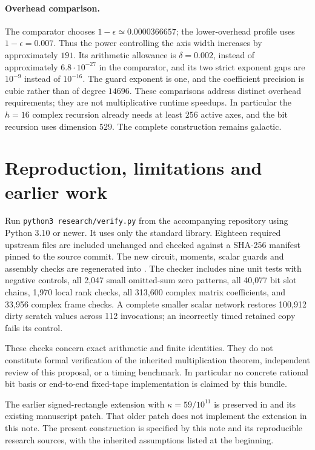 \documentclass[11pt]{article}
\begin{document}
\paragraph{Overhead comparison.}
The comparator chooses $1-\epsilon\simeq0.0000366657$;
the lower-overhead profile uses $1-\epsilon=0.007$.
Thus the power controlling the axis width increases by approximately $191$.
Its arithmetic allowance is $\delta=0.002$, instead of approximately
$6.8\cdot10^{-27}$ in the comparator, and its two strict exponent gaps are
$10^{-9}$ instead of $10^{-16}$.
The guard exponent is one, and the coefficient precision is cubic rather than
of degree $14696$. These comparisons address distinct overhead requirements;
they are not multiplicative runtime speedups. In particular the $h=16$
complex recursion already needs at least $256$ active axes, and the bit
recursion uses dimension $529$. The complete construction remains galactic.

\section{Reproduction, limitations and earlier work}
Run \texttt{python3 research/verify.py} from the accompanying repository using
Python 3.10 or newer. It uses only the standard library. Eighteen required
upstream files are included unchanged and checked against a SHA-256 manifest
pinned to the source commit. The new circuit, moments, scalar guards and
assembly checks are regenerated into .
The checker includes nine unit tests with negative controls, all 2,047 small
omitted-sum zero patterns, all 40,077 bit slot chains, 1,970 local rank checks,
all 313,600 complex matrix coefficients, and 33,956 complex frame checks.
A complete smaller scalar network restores 100,912 dirty scratch values
across 112 invocations; an incorrectly timed retained copy fails its control.

These checks concern exact arithmetic and finite identities. They do not
constitute formal verification of the inherited multiplication theorem,
independent review of this proposal, or a timing benchmark. In particular
no concrete rational bit basis or end-to-end fixed-tape implementation is
claimed by this bundle.

The earlier signed-rectangle extension with $\kappa=59/10^{11}$ is preserved
in  and its existing manuscript
patch. That older patch does not implement the extension in this note.
The present construction is specified by this note and its reproducible
research sources, with the inherited assumptions listed at the beginning.
\end{document}
